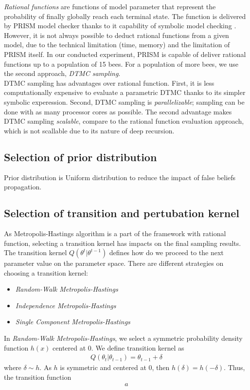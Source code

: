 \textit{Rational functions} are functions of model parameter that represent the
probability of finally globally reach each terminal state. The function is
delivered by PRISM model checker thanks to it capability of symbolic model
checking \cite{kwiatkowska2011prism}.\\
However, it is not always possible to deduct rational functions from a given
model, due to the technical limitation (time, memory) and the limitation of
PRISM itself. In our conducted experiment, PRISM is capable of deliver rational
functions up to a population of 15 bees. For a population of more bees, we use
the second approach, \textit{DTMC sampling}.\\
DTMC sampling has advantages over rational function. First, it is less
computationally expensive to evaluate a parametric DTMC thanks to its simpler
symbolic experession. Second, DTMC sampling is \textit{parallelizable}; sampling
can be done with as many processor cores as possible. The second advantage makes
DTMC sampling \textit{scalable}, compare to the rational function evaluation
approach, which is not scallable due to its nature of deep recursion.

\subsection{Selection of prior distribution}
Prior distribution is Uniform distribution to reduce the impact of false beliefs propagation.

\subsection{Selection of transition and pertubation kernel}
As Metropolis-Hastings algorithm is a part of the framework with rational function, selecting a
transition kernel has impacts on the final sampling results. The transition kernel
$Q(\theta^t|\theta^{t-1})$ defines how do we proceed to the next parameter value on the parameter
space. There are different strategies on choosing a transition kernel:
\begin{itemize}
      \item \textit{Random-Walk Metropolis-Hastings}
      \item \textit{Independence Metropolis-Hastings}
      \item \textit{Single Component Metropolis-Hastings}
\end{itemize}
In \textit{Random-Walk Metropolis-Hastings}, we select a symmetric probability density function
$h(x)$ centered at $0$. We define transition kernel as
\begin{align*}
      Q(\theta_t | \theta_{t-1}) = \theta_{t-1} + \delta
\end{align*}
where $\delta\sim h$. As $h$ is symmetric and centered at $0$, then $h(\delta) = h(-\delta)$. Thus,
the transition function
\begin{align*}
      a
\end{align*}


